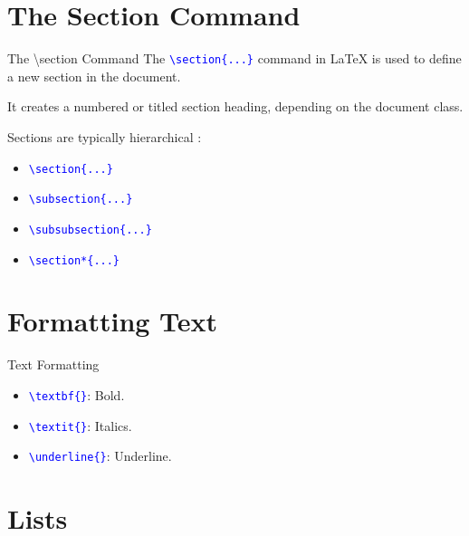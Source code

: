 \documentclass{beamer}
\begin{document}
	
	\section{The Section Command}
	\begin{frame}{The \textbackslash section Command }
		The \texttt{\textcolor{blue}{\textbackslash section\{...\}}} command in LaTeX is used to define a new section in the document. \pause \par
		
		It creates a numbered or titled section heading, depending on the document class. \par
		
		Sections are typically hierarchical :
		\begin{itemize}
			\item \texttt{\textcolor{blue}{\textbackslash section\{...\}}}
			\item \texttt{\textcolor{blue}{\textbackslash subsection\{...\}}}
			\item \texttt{\textcolor{blue}{\textbackslash subsubsection\{...\}}}
			\item \texttt{\textcolor{blue}{\textbackslash section*\{...\}}}
		\end{itemize}
		
	\end{frame}
	
	\section{Formatting Text}
	
	\begin{frame}{Text Formatting}
		\begin{itemize}
			\item \texttt{\textcolor{blue}{\textbackslash textbf\{\}}}: Bold.
			\item \texttt{\textcolor{blue}{\textbackslash textit\{\}}}: Italics.
			\item \texttt{\textcolor{blue}{\textbackslash underline\{\}}}: Underline.
		\end{itemize}
	\end{frame}
	
	\section{Lists}
	
\end{document}
